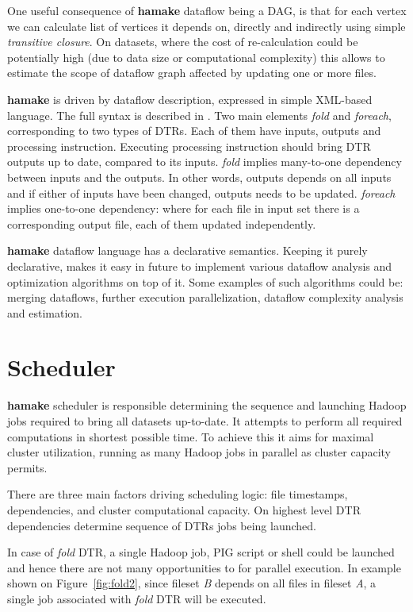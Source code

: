 \documentclass[10pt,conference,letterpaper]{IEEEtran}
\begin{document}
One useful consequence of \textbf{hamake} dataflow being a DAG, is
that for each vertex we can calculate list of vertices it depends on,
directly and indirectly using simple \textit{transitive closure}. On
datasets, where the cost of re-calculation could be potentially high
(due to data size or computational complexity) this allows to estimate
the scope of dataflow graph affected by updating one or more files.

\textbf{hamake} is driven by dataflow description, expressed in simple
XML-based language. The full syntax is described in
\cite{hamakesyntax}. Two main elements \emph{fold} and \emph{foreach},
corresponding to two types of DTRs. Each of them have inputs, outputs
and processing instruction. Executing processing instruction should
bring DTR outputs up to date, compared to its inputs. \emph{fold}
implies many-to-one dependency between inputs and the outputs. In
other words, outputs depends on all inputs and if either of inputs
have been changed, outputs needs to be updated. \emph{foreach} implies
one-to-one dependency: where for each file in input set there is a
corresponding output file, each of them updated independently.

\textbf{hamake} dataflow language has a declarative semantics. Keeping it
purely declarative, makes it easy in future to implement various
dataflow analysis and optimization algorithms on top of it. Some
examples of such algorithms could be: merging dataflows, further
execution parallelization, dataflow complexity analysis and
estimation.

\section{Scheduler}

\textbf{hamake} scheduler is responsible determining the sequence and
launching Hadoop jobs required to bring all datasets up-to-date.  It
attempts to perform all required computations in shortest possible
time. To achieve this it aims for maximal cluster utilization, running
as many Hadoop jobs in parallel as cluster capacity permits.

There are three main factors driving scheduling logic: file
timestamps, dependencies, and cluster computational capacity. On
highest level DTR dependencies determine sequence of DTRs jobs being
launched.

In case of \emph{fold} DTR, a single Hadoop job, PIG script or shell
could be launched and hence there are not many opportunities to for
parallel execution. In example shown on Figure~\ref{fig:fold2}, since
fileset \textit{B} depends on all files in fileset \textit{A}, a
single job associated with \emph{fold} DTR will be executed.
\end{document}
